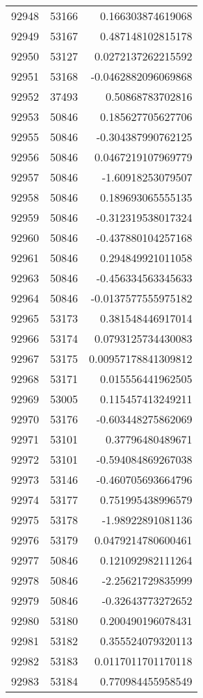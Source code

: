 \begin{tabular}{r | r | r}
92948 & 53166 & 0.166303874619068 \\
92949 & 53167 & 0.487148102815178 \\
92950 & 53127 & 0.0272137262215592 \\
92951 & 53168 & -0.0462882096069868 \\
92952 & 37493 & 0.50868783702816 \\
92953 & 50846 & 0.185627705627706 \\
92955 & 50846 & -0.304387990762125 \\
92956 & 50846 & 0.0467219107969779 \\
92957 & 50846 & -1.60918253079507 \\
92958 & 50846 & 0.189693065555135 \\
92959 & 50846 & -0.312319538017324 \\
92960 & 50846 & -0.437880104257168 \\
92961 & 50846 & 0.294849921011058 \\
92963 & 50846 & -0.456334563345633 \\
92964 & 50846 & -0.0137577555975182 \\
92965 & 53173 & 0.381548446917014 \\
92966 & 53174 & 0.0793125734430083 \\
92967 & 53175 & 0.00957178841309812 \\
92968 & 53171 & 0.015556441962505 \\
92969 & 53005 & 0.115457413249211 \\
92970 & 53176 & -0.603448275862069 \\
92971 & 53101 & 0.37796480489671 \\
92972 & 53101 & -0.594084869267038 \\
92973 & 53146 & -0.460705693664796 \\
92974 & 53177 & 0.751995438996579 \\
92975 & 53178 & -1.98922891081136 \\
92976 & 53179 & 0.0479214780600461 \\
92977 & 50846 & 0.121092982111264 \\
92978 & 50846 & -2.25621729835999 \\
92979 & 50846 & -0.32643773272652 \\
92980 & 53180 & 0.200490196078431 \\
92981 & 53182 & 0.355524079320113 \\
92982 & 53183 & 0.0117011701170118 \\
92983 & 53184 & 0.770984455958549 \\

\end{tabular}
